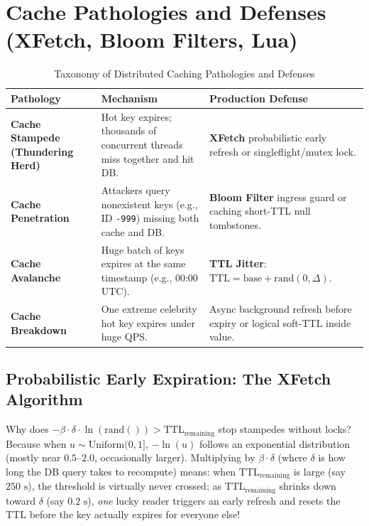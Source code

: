 \section{Cache Pathologies and Defenses (XFetch, Bloom Filters, Lua)}

\begin{table}[htbp]
\centering\small
\begin{tabular}{lp{4.8cm}p{6.2cm}}
\toprule
\textbf{Pathology} & \textbf{Mechanism} & \textbf{Production Defense} \\
\midrule
\textbf{Cache Stampede (Thundering Herd)} & Hot key expires; thousands of concurrent threads miss together and hit DB. & \textbf{XFetch} probabilistic early refresh or singleflight/mutex lock. \\
\textbf{Cache Penetration} & Attackers query nonexistent keys (e.g., ID \texttt{-999}) missing both cache and DB. & \textbf{Bloom Filter} ingress guard or caching short-TTL null tombstones. \\
\textbf{Cache Avalanche} & Huge batch of keys expires at the same timestamp (e.g., 00:00 UTC). & \textbf{TTL Jitter}: $\text{TTL} = \text{base} + \text{rand}(0, \Delta)$. \\
\textbf{Cache Breakdown} & One extreme celebrity hot key expires under huge QPS. & Async background refresh before expiry or logical soft-TTL inside value. \\
\bottomrule
\end{tabular}
\caption{Taxonomy of Distributed Caching Pathologies and Defenses}
\label{tab:v4-ch06-pathologies}
\end{table}

\subsection{Probabilistic Early Expiration: The XFetch Algorithm}

Why does $-\beta \cdot \delta \cdot \ln(\text{rand}()) > \text{TTL}_{\text{remaining}}$ stop stampedes without locks? Because when $u \sim \text{Uniform}(0, 1]$, $-\ln(u)$ follows an exponential distribution (mostly near $0.5\text{--}2.0$, occasionally larger). Multiplying by $\beta \cdot \delta$ (where $\delta$ is how long the DB query takes to recompute) means: when $\text{TTL}_{\text{remaining}}$ is large (say $250\text{ s}$), the threshold is virtually never crossed; as $\text{TTL}_{\text{remaining}}$ shrinks down toward $\delta$ (say $0.2\text{ s}$), \emph{one} lucky reader triggers an early refresh and resets the TTL before the key actually expires for everyone else!

